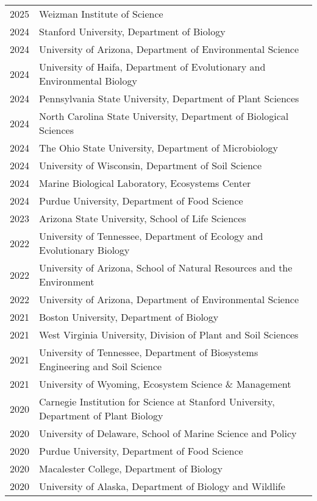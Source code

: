 \documentclass[11pt]{article}
\begin{document}
\begin{longtable}{@{}p{4em}@{\hspace{2em}}p{}@{}}
2025 & Weizman Institute of Science \\
2024 & Stanford University, Department of Biology \\
2024 & University of Arizona, Department of Environmental Science \\
2024 & University of Haifa, Department of Evolutionary and Environmental Biology \\
2024 & Pennsylvania State University, Department of Plant Sciences \\
2024 & North Carolina State University, Department of Biological Sciences \\
2024 & The Ohio State University, Department of Microbiology \\
2024 & University of Wisconsin, Department of Soil Science \\
2024 & Marine Biological Laboratory, Ecosystems Center \\
2024 & Purdue University, Department of Food Science \\
2023 & Arizona State University, School of Life Sciences \\
2022 & University of Tennessee, Department of Ecology and Evolutionary Biology \\
2022 & University of Arizona, School of Natural Resources and the Environment \\
2022 & University of Arizona, Department of Environmental Science \\
2021 & Boston University, Department of Biology \\
2021 & West Virginia University, Division of Plant and Soil Sciences \\
2021 & University of Tennessee, Department of Biosystems Engineering and Soil Science \\
2021 & University of Wyoming, Ecosystem Science \& Management \\
2020 & Carnegie Institution for Science at Stanford University, Department of Plant Biology \\
2020 & University of Delaware, School of Marine Science and Policy \\
2020 & Purdue University, Department of Food Science \\
2020 & Macalester College, Department of Biology \\
2020 & University of Alaska, Department of Biology and Wildlife \\

\end{longtable}
\end{document}
